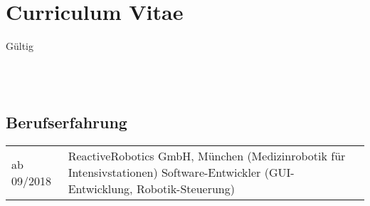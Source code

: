 \documentclass[a4paper,10pt]{memoir}
\begin{document}
\section*{\color{MidnightBlue} Curriculum Vitae}

\begin{flushright}
  Gültig \monthname\,\the\year
\end{flushright}


\\
\\

\subsection*{Berufserfahrung}
\vspace*{-\baselineskip}
\begin{longtable}{@{}p{} p{}}
  ab 09/2018 &
  ReactiveRobotics GmbH, München (Medizinrobotik für Intensivstationen) \newline
  Software-Entwickler (GUI-Entwicklung, Robotik-Steuerung)
\end{longtable}
\end{document}
